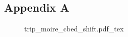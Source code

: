 \subsection*{Appendix A}
\label{appendix:a}

\begin{figure}[t]
    \centering
    \def\svgwidth{.7\linewidth}
    {trip_moire_cbed_shift.pdf_tex}
    \caption{}
    \label{fig:appendix_cbed_trip_moire}
\end{figure}

\subsection*{}
